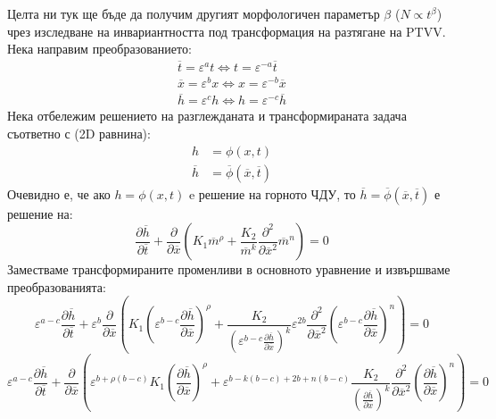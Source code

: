 Целта ни тук ще бъде да получим другият морфологичен параметър $\beta$ ($N \propto t^\beta$) чрез изследване на инвариантността под трансформация на разтягане на PTVV. Нека направим преобразованието:
\[\begin{gathered}
  \overline t  = {\varepsilon ^a}t \Leftrightarrow t = {\varepsilon ^{ - a}}\overline t  \\ 
  \overline x  = {\varepsilon ^b}x \Leftrightarrow x = {\varepsilon ^{ - b}}\overline x  \\ 
  \overline h  = {\varepsilon ^c}h \Leftrightarrow h = {\varepsilon ^{ - c}}\overline h
\end{gathered} \]
Нека отбележим решението на разглежданата и трансформираната задача съответно с (2D равнина):
\begin{align*}
    h  &= \phi(x, t) \\
    \overline{h} &= \overline{\phi}(\overline{x}, \overline{t})
\end{align*}
Очевидно е, че ако $h  = \phi(x, t)$ e решение на горното ЧДУ, то $\overline{h} = \overline{\phi}(\overline{x}, \overline{t})$ е решение на:
\begin{equation*}
    \frac{\partial \overline h}{\partial \overline t} + \frac{\partial }{\partial \overline x} \left( K_{1} \overline m^{\rho} + \frac{K_2}{\overline m^k} \frac{\partial^2 }{\partial \overline x^2} \overline m ^ n \right) = 0
\end{equation*}
Заместваме трансформираните променливи в основното уравнение и извършваме преобразованията:
\begin{equation*}
    {\varepsilon ^{a - c}}\frac{{\partial \overline h }}{{\partial \overline t }} + {\varepsilon ^b}\frac{\partial }{{\partial \overline x }}\left( {{K_1}{{\left( {{\varepsilon ^{b - c}}\frac{{\partial \overline h }}{{\partial \overline x }}} \right)}^\rho } + \frac{{{K_2}}}{{{{\left( {{\varepsilon ^{b - c}}\frac{{\partial \overline h }}{{\partial \overline x }}} \right)}^k}}}{\varepsilon ^{2b}}\frac{{{\partial ^2}}}{{\partial {{\overline x }^2}}}{{\left( {{\varepsilon ^{b - c}}\frac{{\partial \overline h }}{{\partial \overline x }}} \right)}^n}} \right) = 0
\end{equation*}
\begin{equation}
   {\varepsilon ^{a - c}}\frac{{\partial \overline h }}{{\partial \overline t }} + \frac{\partial }{{\partial \overline x }}\left( {{\varepsilon ^{b + \rho (b - c)}}{K_1}{{\left( {\frac{{\partial \overline h }}{{\partial \overline x }}} \right)}^\rho } + {\varepsilon ^{b - k(b - c) + 2b + n(b - c)}}\frac{{{K_2}}}{{{{\left( {\frac{{\partial \overline h }}{{\partial \overline x }}} \right)}^k}}}\frac{{{\partial ^2}}}{{\partial {{\overline x }^2}}}{{\left( {\frac{{\partial \overline h }}{{\partial \overline x }}} \right)}^n}} \right) = 0
   \label{eq:ptvv_subst_eps}
\end{equation}

